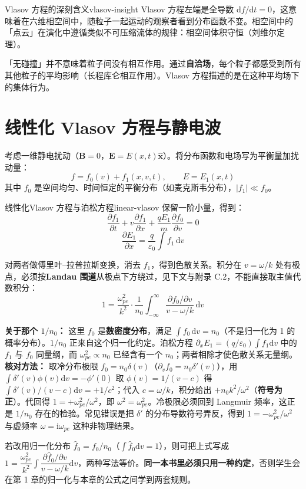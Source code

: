 \documentclass[12pt,a4paper,openany,oneside]{book}
\newcommand{\diffmarktext}[1]{%
  \textcolor{coverMid!80}{\rule[-0.1em]{2pt}{0.9em}}\,%
  \textcolor{coverMid}{\footnotesize\textbf{[#1]}}%
}
\newcommand{\difficulty}[1]{\marginnote{\raggedright\diffmarktext{#1}}}
\newcommand{\diff}{\mathrm{d}}
\newcommand{\ii}{\mathrm{i}}
\newcommand{\eps}{\varepsilon}
\newcommand{\vect}[1]{\bm{#1}}
\newcommand{\unitvec}[1]{\hat{\vect{#1}}}
\begin{document}
\begin{insight}{Vlasov 方程的深刻含义}{vlasov-insight}
Vlasov 方程左端是全导数 $\diff f/\diff t = 0$，这意味着在六维相空间中，随粒子一起运动的观察者看到分布函数不变。相空间中的「点云」在演化中遵循类似不可压缩流体的规律：相空间体积守恒（刘维尔定理）。

「无碰撞」并不意味着粒子间没有相互作用。通过\textbf{自洽场}，每个粒子都感受到所有其他粒子的平均影响（长程库仑相互作用）。Vlasov 方程描述的是在这种平均场下的集体行为。
\end{insight}

\section{线性化 Vlasov 方程与静电波}\difficulty{提高}

考虑一维静电扰动（$\vect{B}=0$，$\vect{E} = E(x,t)\unitvec{x}$）。将分布函数和电场写为平衡量加扰动量：
\[
f = f_0(v) + f_1(x,v,t), \qquad E = E_1(x,t)
\]
其中 $f_0$ 是空间均匀、时间恒定的平衡分布（如麦克斯韦分布），$|f_1| \ll f_0$。

\begin{theorem}{线性化Vlasov 方程与泊松方程}{linear-vlasov}
保留一阶小量，得到：
\[
\frac{\partial f_1}{\partial t} + v\frac{\partial f_1}{\partial x} + \frac{qE_1}{m}\frac{\partial f_0}{\partial v} = 0
\]
\[
\frac{\partial E_1}{\partial x} = \frac{q}{\eps_0}\int f_1\,\diff v
\]

对两者做傅里叶--拉普拉斯变换，消去 $f_1$，得到色散关系。积分在 $v=\omega/k$ 处有极点，必须按\textbf{Landau 围道}从极点下方绕过，见下文与附录 C.2，不能直接取主值代数积分：
\[
1 = \frac{\omega_{pe}^2}{k^2}\cdot\frac{1}{n_0}\int_{-\infty}^{\infty} \frac{\partial f_0/\partial v}{v - \omega/k}\,\diff v
\]

\textbf{关于那个 $1/n_0$：} 这里 $f_0$ 是\textbf{数密度分布}，满足 $\int f_0\,\diff v = n_0$（不是归一化为 1 的概率分布）。$1/n_0$ 正来自这个归一化约定。泊松方程 $\partial_xE_1=(q/\eps_0)\int f_1\diff v$ 中的 $f_1$ 与 $f_0$ 同量纲，而 $\omega_{pe}^2\propto n_0$ 已经含有一个 $n_0$；两者相除才使色散关系无量纲。\textbf{核对方法：} 取冷分布极限 $f_0=n_0\delta(v)$（$\partial_vf_0=n_0\delta'(v)$），用 $\int\delta'(v)\phi(v)\diff v=-\phi'(0)$ 取 $\phi(v)=1/(v-c)$ 得 $\int\delta'(v)/(v-c)\diff v=+1/c^2$；代入 $c=\omega/k$，积分给出 $\boxed{+n_0k^2/\omega^2}$（\textbf{符号为正}）。代回得 $1=+\omega_{pe}^2/\omega^2$，即 $\omega^2=\omega_{pe}^2$。冷极限必须回到 Langmuir 频率，这正是 $1/n_0$ 存在的检验。常见错误是把 $\delta'$ 的分布导数符号弄反，得到 $1=-\omega_{pe}^2/\omega^2$ 与虚频率 $\omega=\ii\omega_{pe}$ 这种非物理结果。

若改用归一化分布 $\hat f_0=f_0/n_0$（$\int\hat f_0\diff v=1$），则可把上式写成 $1=\dfrac{\omega_{pe}^2}{k^2}\displaystyle\int\dfrac{\partial\hat f_0/\partial v}{v-\omega/k}\diff v$，两种写法等价。\textbf{同一本书里必须只用一种约定}，否则学生会在第 1 章的归一化与本章的公式之间学到两套规则。
\end{theorem}
\end{document}
